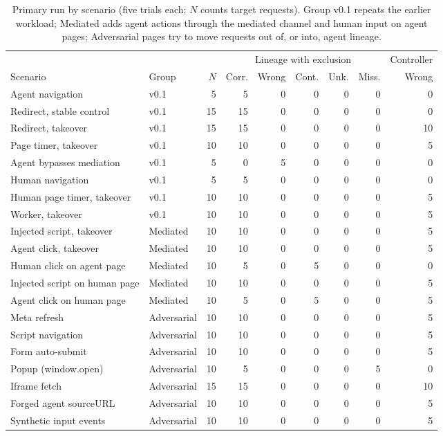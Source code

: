 \begin{table}[tb]
\centering\footnotesize
\setlength{\tabcolsep}{4pt}
\begin{tabularx}{\linewidth}{@{}Xlrrrrrrr@{}}
\toprule
& & & \multicolumn{5}{c}{Lineage with exclusion} & Controller \\
\cmidrule(lr){4-8}\cmidrule(l){9-9}
Scenario & Group & $N$ & Corr. & Wrong & Cont. & Unk. & Miss. & Wrong \\
\midrule
Agent navigation & v0.1 & 5 & 5 & 0 & 0 & 0 & 0 & 0 \\
Redirect, stable control & v0.1 & 15 & 15 & 0 & 0 & 0 & 0 & 0 \\
Redirect, takeover & v0.1 & 15 & 15 & 0 & 0 & 0 & 0 & 10 \\
Page timer, takeover & v0.1 & 10 & 10 & 0 & 0 & 0 & 0 & 5 \\
Agent bypasses mediation & v0.1 & 5 & 0 & 5 & 0 & 0 & 0 & 0 \\
Human navigation & v0.1 & 5 & 5 & 0 & 0 & 0 & 0 & 0 \\
Human page timer, takeover & v0.1 & 10 & 10 & 0 & 0 & 0 & 0 & 5 \\
Worker, takeover & v0.1 & 10 & 10 & 0 & 0 & 0 & 0 & 5 \\
Injected script, takeover & Mediated & 10 & 10 & 0 & 0 & 0 & 0 & 5 \\
Agent click, takeover & Mediated & 10 & 10 & 0 & 0 & 0 & 0 & 5 \\
Human click on agent page & Mediated & 10 & 5 & 0 & 5 & 0 & 0 & 0 \\
Injected script on human page & Mediated & 10 & 10 & 0 & 0 & 0 & 0 & 5 \\
Agent click on human page & Mediated & 10 & 5 & 0 & 5 & 0 & 0 & 5 \\
Meta refresh & Adversarial & 10 & 10 & 0 & 0 & 0 & 0 & 5 \\
Script navigation & Adversarial & 10 & 10 & 0 & 0 & 0 & 0 & 5 \\
Form auto-submit & Adversarial & 10 & 10 & 0 & 0 & 0 & 0 & 5 \\
Popup (window.open) & Adversarial & 10 & 5 & 0 & 0 & 0 & 5 & 0 \\
Iframe fetch & Adversarial & 15 & 15 & 0 & 0 & 0 & 0 & 10 \\
Forged agent sourceURL & Adversarial & 10 & 10 & 0 & 0 & 0 & 0 & 5 \\
Synthetic input events & Adversarial & 10 & 10 & 0 & 0 & 0 & 0 & 5 \\
\bottomrule
\end{tabularx}
\caption{Primary run by scenario (five trials each; $N$ counts target requests). Group v0.1 repeats the earlier workload; Mediated adds agent actions through the mediated channel and human input on agent pages; Adversarial pages try to move requests out of, or into, agent lineage.}
\label{tab:scenarios}
\end{table}
